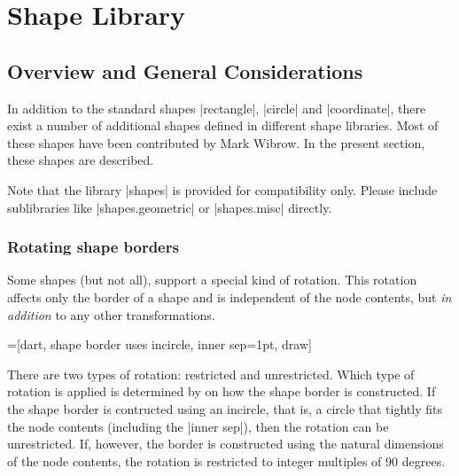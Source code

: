 %
%
%

\section{Shape Library}
\label{section-libs-shapes}


\subsection{Overview and General Considerations}

In addition to the standard shapes |rectangle|, |circle| and
|coordinate|, there exist a number of additional shapes defined in
different shape libraries. Most of these shapes have been 
contributed by Mark Wibrow. In the present section, these shapes are
described.

Note that the library |shapes| is provided for compatibility
only. Please include sublibraries like |shapes.geometric| or
|shapes.misc| directly.


\subsubsection{Rotating shape borders} \label{section-rotating-shape-borders}

Some shapes (but not all), support a special kind of rotation. This 
rotation affects only the border of a shape and is independent of the 
node contents, but \emph{in addition} to any other transformations.
	
\begin{codeexample}[]
=[dart, shape border uses incircle, 
  inner sep=1pt, draw]
\end{codeexample}

There are two types of rotation: restricted and unrestricted. Which 
type of rotation is applied is determined by on how the shape border 
is	constructed. If the shape border is contructed using an incircle, 
that is, a circle that tightly fits the node contents (including 
the |inner sep|), then the rotation can be unrestricted. If, however,
the border is constructed using the natural dimensions of the node
contents, the rotation is restricted to integer multiples of 90 
degrees.

